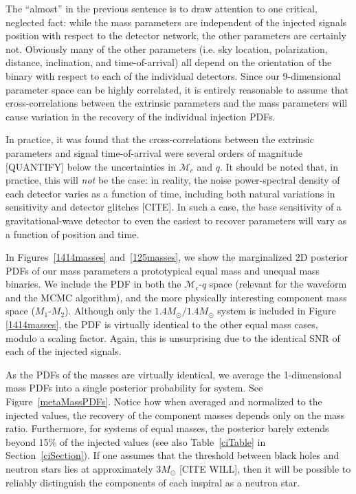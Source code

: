 \documentclass[11pt,a4paper]{emulateapj}
\newcommand{\carl}[1]{{\color{red}  #1}}
\begin{document}
The ``almost'' in the previous sentence is to draw attention to one critical, neglected fact: while the mass parameters are independent of the injected signals position with respect to the detector network, the other parameters are certainly not.  Obviously many of the other parameters (i.e. sky location, polarization, distance, inclination, and time-of-arrival) all depend on the orientation of the binary with respect to each of the individual detectors.  Since our 9-dimensional parameter space can be highly correlated, it is entirely reasonable to assume that cross-correlations between the extrinsic parameters and the mass parameters will cause variation in the recovery of the individual injection PDFs.  

In practice, it was found that the cross-correlations between the extrinsic parameters and signal time-of-arrival were several orders of magnitude \carl{[QUANTIFY]} below the uncertainties in $\mathcal{M}_c$ and $q$.  It should be noted that, in practice, this will \emph{not} be the case: in reality, the noise power-spectral density of each detector varies as a function of time, including both natural variations in sensitivity and detector glitches \carl{[CITE]}.  In such a case, the base sensitivity of a gravitational-wave detector to even the easiest to recover parameters will vary as a function of position and time.  

In Figures~\ref{1414masses} and~\ref{125masses}, we show the marginalized 2D posterior PDFs of our mass parameters a prototypical equal mass and unequal mass binaries.  We include the PDF in both the $\mathcal{M}_c$-$q$ space (relevant for the waveform and the MCMC algorithm), and the more physically interesting component mass space ($M_1$-$M_2$).  Although only the $1.4M_{\odot}/1.4M_{\odot}$ system is included in Figure \ref{1414masses}, the PDF is virtually identical to the other equal mass cases, modulo a scaling factor.  Again, this is unsurprising due to the identical SNR of each of the injected signals.   

As the PDFs of the masses are virtually identical, we average the 1-dimensional mass PDFs into a single posterior probability for
system.  See Figure~\ref{metaMassPDFs}.  Notice how when averaged and normalized to the injected values, the recovery of the component masses depends only on the mass ratio.  Furthermore, for systems of equal masses, the posterior barely extends beyond 15\% of the injected values (see also Table~\ref{ciTable} in Section~\ref{ciSection}).  If one assumes that the threshold between black holes and neutron stars lies at approximately $3M_{\odot}$ \carl{[CITE WILL]}, then it will be possible to reliably distinguish the components of each inspiral as a neutron star. 
\end{document}
